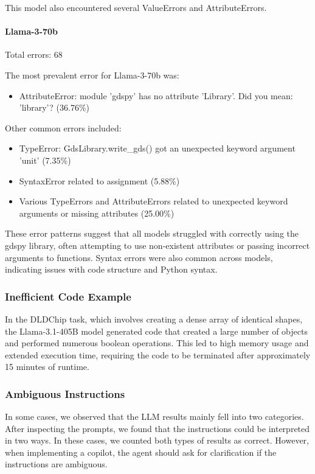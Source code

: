 \documentclass{article}
\begin{document}
This model also encountered several ValueErrors and AttributeErrors.

\paragraph{Llama-3-70b}
Total errors: 68

The most prevalent error for Llama-3-70b was:
\begin{itemize}
    \item AttributeError: module 'gdspy' has no attribute 'Library'. Did you mean: 'library'? (36.76\%)
\end{itemize}

Other common errors included:
\begin{itemize}
    \item TypeError: GdsLibrary.write\_gds() got an unexpected keyword argument 'unit' (7.35\%)
    \item SyntaxError related to assignment (5.88\%)
    \item Various TypeErrors and AttributeErrors related to unexpected keyword arguments or missing attributes (25.00\%)
\end{itemize}

These error patterns suggest that all models struggled with correctly using the gdspy library, often attempting to use non-existent attributes or passing incorrect arguments to functions. Syntax errors were also common across models, indicating issues with code structure and Python syntax.

\subsubsection{Inefficient Code Example}
\label{appendix:inefficient_code}

In the DLDChip task, which involves creating a dense array of identical shapes, the Llama-3.1-405B model generated code that created a large number of objects and performed numerous boolean operations. This led to high memory usage and extended execution time, requiring the code to be terminated after approximately 15 minutes of runtime.

\subsubsection{Ambiguous Instructions}
\label{appendix:ambiguous_instructions}

In some cases, we observed that the LLM results mainly fell into two categories. After inspecting the prompts, we found that the instructions could be interpreted in two ways. In these cases, we counted both types of results as correct. However, when implementing a copilot, the agent should ask for clarification if the instructions are ambiguous.
\end{document}
